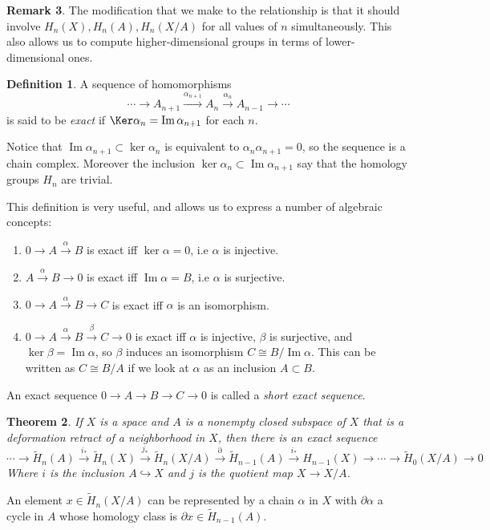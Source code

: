\documentclass[11pt,a4paper]{article}
\theoremstyle{definition}
\newtheorem{definition}{Definition}[section]
\newtheorem{remark}[definition]{Remark}
\theoremstyle{plain}
\newtheorem{theorem}[definition]{Theorem}
\theoremstyle{remark}
\begin{document}
\begin{remark}
The modification that we make to the relationship is that it should involve $H_n(X), H_n (A), H_n(X/A)$ for 
all values of $n$ simultaneously. This also allows us to compute higher-dimensional 
groups in terms of lower-dimensional ones. 

\begin{definition}
  A sequence of homomorphisms 
  $$ \cdots \rightarrow A_{n+1} \xrightarrow{\alpha_{n+1}} A_n \xrightarrow{\alpha_n} A_{n-1} \rightarrow \cdots$$
  is said to be \emph{exact} if $\Ker \alpha_n = \operatorname{Im} \alpha_{n+1}$ for each $n$. 
\end{definition}
Notice that $\operatorname{Im} \alpha_{n+1} \subset \ker \alpha_n$ is equivalent to 
$\alpha_n \alpha_{n+1} = 0$, so the sequence is a chain complex. 
Moreover the inclusion $\ker \alpha_n \subset \operatorname{Im} \alpha_{n+1}$ say that the 
homology groups $H_n$ are trivial. 

This definition is very useful, and allows us to express a number of algebraic concepts: 
\begin{enumerate}[label = (\roman*)]
  \item $0 \to A \xrightarrow{\alpha} B$ is exact iff $\ker \alpha = 0$, i.e $\alpha$ is injective. 
  \item $A \xrightarrow{\alpha} B \to 0$ is exact iff $\operatorname{Im} \alpha = B$, i.e $\alpha$ is surjective. 
  \item $0 \to A \xrightarrow{\alpha} B \to C$ is exact iff $\alpha$ is an isomorphism. 
  \item $0 \to A \xrightarrow{\alpha} B \xrightarrow{\beta} C \to 0$ is exact iff $\alpha$ is injective, 
  $\beta$ is surjective, and $\ker \beta = \operatorname{Im} \alpha$, so $\beta$ induces an isomorphism 
  $C \cong B / \operatorname{Im} \alpha$. This can be written as $C \cong B / A$ if we look at 
  $\alpha$ as an inclusion $A \subset B$. 
\end{enumerate}

An exact sequence $0 \to A \to B \to C \to 0$ is called a \emph{short exact sequence}. 

\begin{theorem}
  If $X$ is a space and $A$ is a nonempty closed subspace of $X$ that 
  is a deformation retract of a neighborhood in $X$, then there is an exact sequence
  $$\cdots \to \tilde{H}_n(A) \xrightarrow{i_*} \tilde{H}_n(X) \xrightarrow{j_*}
  \tilde{H}_n (X / A) \xrightarrow{\partial} \tilde{H}_{n-1}(A) \xrightarrow{i_*} H_{n-1}(X) \to \cdots \to \tilde{H}_0(X/A) \to 0$$
  Where $i$ is the inclusion $A \hookrightarrow X$ and $j$ is the quotient map $X \to X/A$. 
\end{theorem}
An element $x \in \tilde{H}_n(X/A)$ can be represented by a chain $\alpha$ in $X$ with $\partial \alpha$ a cycle in 
$A$ whose homology class is $\partial x \in \tilde{H}_{n-1}(A)$. 


\end{remark}
\end{document}
